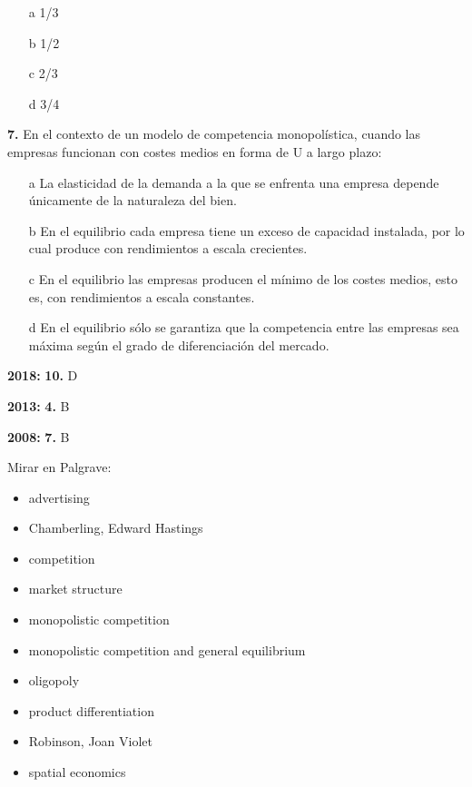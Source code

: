 \documentclass{nuevotema}
\begin{document}
\begin{enumerate}
	\item[a] 1/3
	\item[b] 1/2
	\item[c] 2/3
	\item[d] 3/4
\end{enumerate}


\textbf{7.} En el contexto de un modelo de competencia monopolística, cuando las empresas funcionan con costes medios en forma de U a largo plazo:

\begin{itemize}
	\item[a] La elasticidad de la demanda a la que se enfrenta una empresa depende únicamente de la naturaleza del bien.
	\item[b] En el equilibrio cada empresa tiene un exceso de capacidad instalada, por lo cual produce con rendimientos a escala crecientes.
	\item[c] En el equilibrio las empresas producen el mínimo de los costes medios, esto es, con rendimientos a escala constantes.
	\item[d] En el equilibrio sólo se garantiza que la competencia entre las empresas sea máxima según el grado de diferenciación del mercado.
\end{itemize}

\notas

\textbf{2018:} \textbf{10.} D

\textbf{2013:} \textbf{4.} B

\textbf{2008:} \textbf{7.} B

\bibliografia

Mirar en Palgrave:

\begin{itemize}
	\item advertising
	\item Chamberling, Edward Hastings
	\item competition
	\item market structure
	\item monopolistic competition
	\item monopolistic competition and general equilibrium
	\item oligopoly
	\item product differentiation
	\item Robinson, Joan Violet
	\item spatial economics
\end{itemize}
\end{document}
